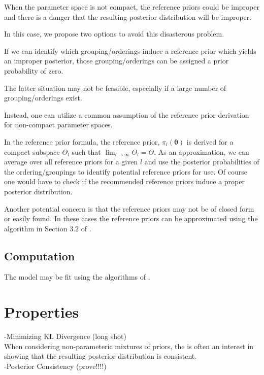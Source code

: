 \documentclass[11pt,a4paper,notitlepage]{article}
\begin{document}
When the parameter space is not compact, the reference priors could be
improper and there is a danger that the resulting posterior
distribution will be improper.

In this case, we propose two options to avoid this disasterous
problem.  

If we can identify which grouping/orderings induce a reference prior
which yields an improper posterior, those grouping/orderings can be
assigned a prior probability of zero.  

The latter situation may not be feasible, especially if a large number
of grouping/orderings exist.  

Instead, one can utilize a common assumption of the reference prior
derivation for non-compact parameter spaces.  

In the reference prior formula, the reference prior,
$\pi_l(\boldsymbol{\theta})$ is derived for a compact subspace
$\Theta_l$ such that $\lim_{l \to \infty}\Theta_l = \Theta$.  As an
approximation, we can average over all reference priors for a given
$l$ and use the posterior probabilities of the ordering/groupings to
identify potential reference priors for use.  Of course one would have
to check if the recommended reference priors induce a proper posterior
distribution.


Another potential concern is that the reference priors may not be of
closed form or easily found.  In these cases the reference priors 
can be approximated using the algorithm in Section 3.2 of \cite{BergerBernardo1994}.


\subsection{Computation} \label{sec:comp}



The model may be fit using the algorithms of \cite{Neal2000}.

\section{Properties}

-Minimizing KL Divergence (long shot)\\

When considering non-parameteric mixtures of priors, the is often an
interest in showing that the resulting posterior distribution is consistent. \\

-Posterior Consistency (prove!!!!)\\
\end{document}
